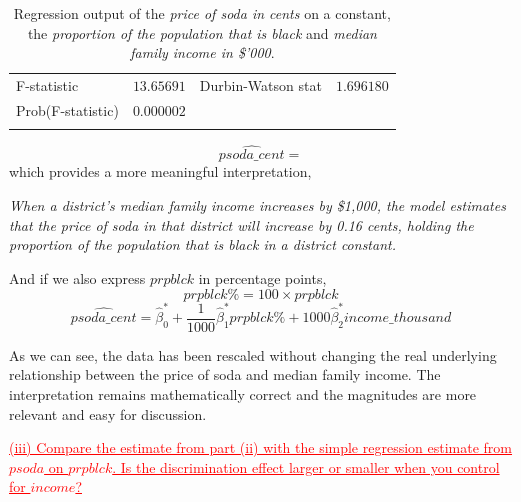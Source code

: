 \documentclass[12pt]{report}
\begin{document}
\begin{table}[H]
\begin{tabular}{lrrrr}
		\multicolumn{1}{l}{F-statistic}&\multicolumn{1}{r}{$13.65691$}&\multicolumn{2}{l}{Durbin-Watson stat}&\multicolumn{1}{r}{$1.696180$}\\
		\multicolumn{1}{l}{Prob(F-statistic)}&\multicolumn{1}{r}{$0.000002$}&\multicolumn{1}{c}{}&\multicolumn{1}{c}{}&\multicolumn{1}{c}{}\\
		[4.5pt] \hline \\ [-4.5pt]
	\end{tabular}
	\caption{Regression output of the \textit{price of soda in cents} on a constant, the \textit{proportion of the population that is black} and \textit{median family income in \$'000}.}
\end{table}

\vspace{-\baselineskip}
$$\widehat{psoda\_cent}=$$
\noindent which provides a more meaningful interpretation,

\centering
\textit{When a district’s median family income increases by \$1,000, the model estimates that the price of soda in that district will increase by 0.16 cents, holding the proportion of the population that is black in a district constant.}

\justify
\noindent And if we also express $prpblck$ in percentage points, $$prpblck\% = 100\times prpblck$$ $$\widehat{psoda\_cent} = \hat{\beta}_{0}^{*} + \dfrac{1}{1000}\hat{\beta}_{1}^{*}prpblck\% + 1000\hat{\beta}_{2}^{*}income\_thousand$$

\justify
\noindent As we can see, the data has been rescaled without changing the real underlying relationship between the price of soda and median family income. The interpretation remains mathematically correct and the magnitudes are more relevant and easy for discussion.

\noindent \textcolor{red}
{
	\ul{(iii) Compare the estimate from part (ii) with the simple regression estimate from $psoda$ on $prpblck$. Is the discrimination effect larger or smaller when you control for $income$?}
}
\end{document}
